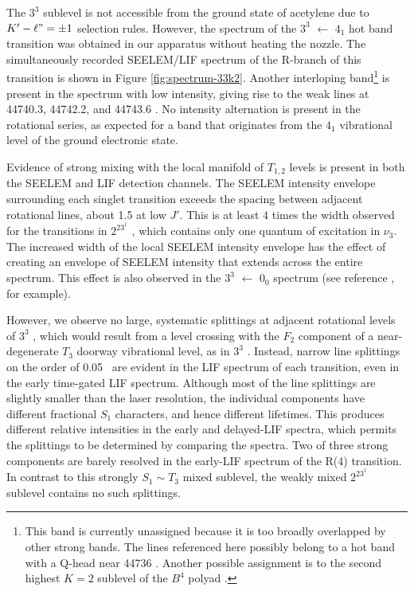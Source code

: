 \documentclass[12pt]{mitthesis}
\begin{document}
The $3^3$  sublevel is not accessible from the ground state of
acetylene due to $K' - \ell" = \pm 1$ selection rules.  However, the
spectrum of the $3^3$  $\leftarrow$ $4_1$ hot band transition
was obtained in our apparatus without heating the nozzle.  The
simultaneously recorded SEELEM/LIF spectrum of the R-branch of this
transition is shown in Figure \ref{fig:spectrum-33k2}.  Another
interloping band\footnote{This band is currently unassigned because it
  is too broadly overlapped by other strong bands.  The lines
  referenced here possibly belong to a hot band with a Q-head near
  44736 \rcm.  Another possible assignment is to the second highest
  $K=2$ sublevel of the $B^4$ polyad \cite{merer-private}.} is present
in the spectrum with low intensity, giving rise to the weak lines at
44740.3, 44742.2, and 44743.6 \rcm.  No intensity alternation is
present in the rotational series, as expected for a band that
originates from the $4_1$ vibrational level of the ground electronic
state.

Evidence of strong mixing with the local manifold of $T_{1,2}$ levels
is present in both the SEELEM and LIF detection channels.  The SEELEM
intensity envelope surrounding each singlet transition exceeds the
spacing between adjacent rotational lines, about 1.5 \rcm at low $J'$.
This is at least 4 times the width observed for the transitions in
$2^23^1$ , which contains only one quantum of excitation in
$\nu_3$.  The increased width of the local SEELEM intensity envelope
has the effect of creating an envelope of SEELEM intensity that
extends across the entire spectrum.  This effect is also observed in
the $3^3$  $\leftarrow$ $0_0$ spectrum (see reference
\cite{humphrey97}, for example).  

However, we observe no large, systematic splittings at adjacent
rotational levels of $3^3$ , which would result from a level
crossing with the $F_2$ component of a near-degenerate $T_3$ doorway
vibrational level, as in $3^3$  \cite{mishra04}.  Instead,
narrow line splittings on the order of 0.05 \rcm\ are evident in the
LIF spectrum of each transition, even in the early time-gated LIF
spectrum.  Although most of the line splittings are slightly smaller
than the laser resolution, the individual components have different
fractional $S_1$ characters, and hence different lifetimes.  This
produces different relative intensities in the early and delayed-LIF
spectra, which permits the splittings to be determined by comparing
the spectra.  Two of three strong components are barely resolved in
the early-LIF spectrum of the R(4) transition.  In contrast to this
strongly $S_1 \sim T_3$ mixed sublevel, the weakly mixed $2^23^1$
 sublevel contains no such splittings.
\end{document}
